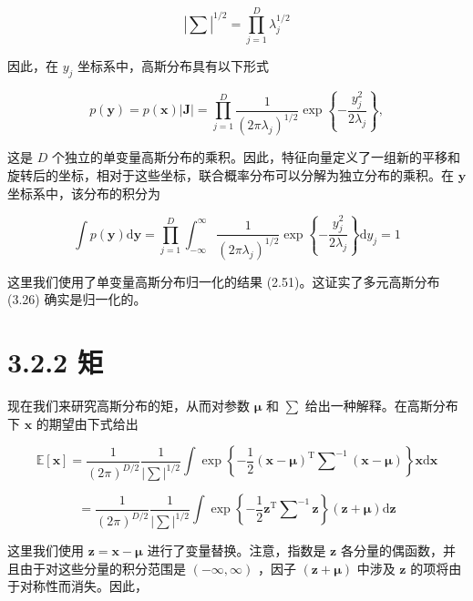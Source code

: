\documentclass[10pt]{report}
\begin{document}
\[
{\left| \mathbf{\sum }\right| }^{1/2} = \mathop{\prod }\limits_{{j = 1}}^{D}{\lambda }_{j}^{1/2} \tag{3.38}
\]

因此，在 \({y}_{j}\) 坐标系中，高斯分布具有以下形式

\[
p\left( \mathbf{y}\right)  = p\left( \mathbf{x}\right) \left| \mathbf{J}\right|  = \mathop{\prod }\limits_{{j = 1}}^{D}\frac{1}{{\left( 2\pi {\lambda }_{j}\right) }^{1/2}}\exp \left\{  {-\frac{{y}_{j}^{2}}{2{\lambda }_{j}}}\right\}  , \tag{3.39}
\]

这是 \(D\) 个独立的单变量高斯分布的乘积。因此，特征向量定义了一组新的平移和旋转后的坐标，相对于这些坐标，联合概率分布可以分解为独立分布的乘积。在 \(\mathbf{y}\) 坐标系中，该分布的积分为

\[
\int p\left( \mathbf{y}\right) \mathrm{d}\mathbf{y} = \mathop{\prod }\limits_{{j = 1}}^{D}{\int }_{-\infty }^{\infty }\frac{1}{{\left( 2\pi {\lambda }_{j}\right) }^{1/2}}\exp \left\{  {-\frac{{y}_{j}^{2}}{2{\lambda }_{j}}}\right\}  \mathrm{d}{y}_{j} = 1 \tag{3.40}
\]

这里我们使用了单变量高斯分布归一化的结果 (2.51)。这证实了多元高斯分布 (3.26) 确实是归一化的。

\section*{3.2.2 矩}

现在我们来研究高斯分布的矩，从而对参数 \(\mathbf{\mu }\) 和 \(\mathbf{\sum }\) 给出一种解释。在高斯分布下 \(\mathbf{x}\) 的期望由下式给出

\[
\mathbb{E}\left\lbrack  \mathbf{x}\right\rbrack   = \frac{1}{{\left( 2\pi \right) }^{D/2}}\frac{1}{{\left| \mathbf{\sum }\right| }^{1/2}}\int \exp \left\{  {-\frac{1}{2}{\left( \mathbf{x} - \mathbf{\mu }\right) }^{\mathrm{T}}{\mathbf{\sum }}^{-1}\left( {\mathbf{x} - \mathbf{\mu }}\right) }\right\}  \mathbf{x}\mathrm{d}\mathbf{x}
\]

\[
= \frac{1}{{\left( 2\pi \right) }^{D/2}}\frac{1}{{\left| \mathbf{\sum }\right| }^{1/2}}\int \exp \left\{  {-\frac{1}{2}{\mathbf{z}}^{\mathrm{T}}{\mathbf{\sum }}^{-1}\mathbf{z}}\right\}  \left( {\mathbf{z} + \mathbf{\mu }}\right) \mathrm{d}\mathbf{z} \tag{3.41}
\]

这里我们使用 \(\mathbf{z} = \mathbf{x} - \mathbf{\mu }\) 进行了变量替换。注意，指数是 \(\mathbf{z}\) 各分量的偶函数，并且由于对这些分量的积分范围是 \(\left( {-\infty ,\infty }\right)\) ，因子 \(\left( {\mathbf{z} + \mathbf{\mu }}\right)\) 中涉及 \(\mathbf{z}\) 的项将由于对称性而消失。因此，
\end{document}
